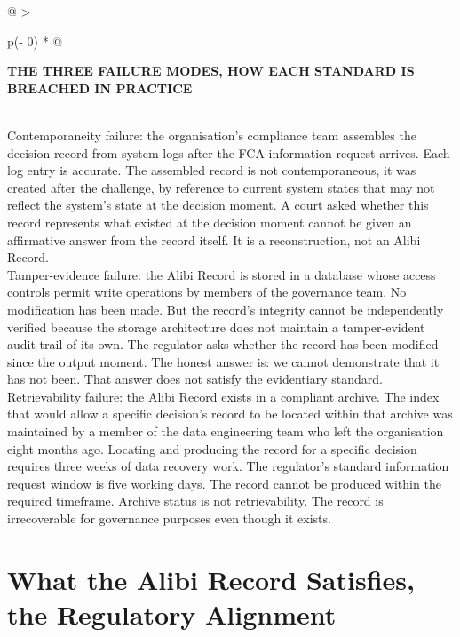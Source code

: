 \begin{longtable}[]{@{}
  >{\raggedright\arraybackslash}p{(\columnwidth - 0\tabcolsep) * }@{}}
\toprule\noalign{}
\begin{minipage}[b]{\linewidth}\raggedright
\textbf{THE THREE FAILURE MODES, HOW EACH STANDARD IS BREACHED IN PRACTICE}
\end{minipage} \\
\midrule\noalign{}
\endhead
\bottomrule\noalign{}
\endlastfoot
Contemporaneity failure: the organisation's compliance team assembles the decision record from system logs after the FCA information request arrives. Each log entry is accurate. The assembled record is not contemporaneous, it was created after the challenge, by reference to current system states that may not reflect the system's state at the decision moment. A court asked whether this record represents what existed at the decision moment cannot be given an affirmative answer from the record itself. It is a reconstruction, not an Alibi Record. \\
Tamper-evidence failure: the Alibi Record is stored in a database whose access controls permit write operations by members of the governance team. No modification has been made. But the record's integrity cannot be independently verified because the storage architecture does not maintain a tamper-evident audit trail of its own. The regulator asks whether the record has been modified since the output moment. The honest answer is: we cannot demonstrate that it has not been. That answer does not satisfy the evidentiary standard. \\
Retrievability failure: the Alibi Record exists in a compliant archive. The index that would allow a specific decision's record to be located within that archive was maintained by a member of the data engineering team who left the organisation eight months ago. Locating and producing the record for a specific decision requires three weeks of data recovery work. The regulator's standard information request window is five working days. The record cannot be produced within the required timeframe. Archive status is not retrievability. The record is irrecoverable for governance purposes even though it exists. \\
\end{longtable}

\scenebreak

\section{What the Alibi Record Satisfies, the Regulatory Alignment}

